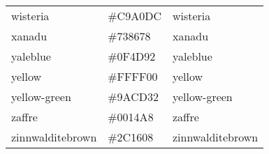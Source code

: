 \documentclass[
]{article}
\begin{document}
\begin{longtable}[]{@{}lll@{}}
wisteria & \colorbox[rgb]{0.79,0.63,0.86}{\#C9A0DC} &
\textcolor[rgb]{0.79,0.63,0.86}{wisteria              }\tabularnewline
xanadu & \colorbox[rgb]{0.45,0.53,0.47}{\#738678} &
\textcolor[rgb]{0.45,0.53,0.47}{xanadu                }\tabularnewline
yaleblue & \colorbox[rgb]{0.06,0.3,0.57}{\#0F4D92} &
\textcolor[rgb]{0.06,0.3,0.57}{yaleblue              }\tabularnewline
yellow & \colorbox[rgb]{1.0,1.0,0.0}{\#FFFF00} &
\textcolor[rgb]{1.0,1.0,0.0}{yellow                }\tabularnewline
yellow-green & \colorbox[rgb]{0.6,0.8,0.2}{\#9ACD32} &
\textcolor[rgb]{0.6,0.8,0.2}{yellow-green          }\tabularnewline
zaffre & \colorbox[rgb]{0.0,0.08,0.66}{\#0014A8} &
\textcolor[rgb]{0.0,0.08,0.66}{zaffre                }\tabularnewline
zinnwalditebrown & \colorbox[rgb]{0.17,0.09,0.03}{\#2C1608} &
\textcolor[rgb]{0.17,0.09,0.03}{zinnwalditebrown      }\tabularnewline
\bottomrule
\end{longtable}
\end{document}
